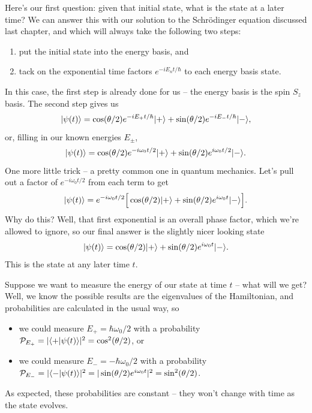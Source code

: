 Here's our first question:  given that initial state, what is the state at a later time?  We can answer this with our solution to the Schr\"odinger equation discussed last chapter, and which will always take the following two steps:
\begin{enumerate}
\item put the initial state into the energy basis, and
\item tack on the exponential time factors $e^{-iE_nt/\hbar}$ to each energy basis state.
\end{enumerate}
In this case, the first step is already done for us -- the energy basis is the spin $S_z$ basis.  The second step gives us
\[
| \psi(t) \rangle = \cos(\theta/2) e^{-iE_+ t / \hbar} | + \rangle + \sin (\theta/2) e^{-iE_- t / \hbar} | - \rangle,
\]
or, filling in our known energies $E_\pm$,
\[
| \psi(t) \rangle = \cos(\theta/2) e^{-i\omega_0 t / 2} | + \rangle + \sin (\theta/2) e^{i\omega_0 t / 2} | - \rangle.
\]
One more little trick -- a pretty common one in quantum mechanics.  Let's pull out a factor of $e^{-i\omega_0 t/2}$ from each term to get
\[
| \psi(t) \rangle = e^{-i\omega_0 t/2} \Big[ \cos(\theta/2) | + \rangle + \sin (\theta/2) e^{i\omega_0 t} | - \rangle \Big].
\]
Why do this?  Well, that first exponential is an overall phase factor, which we're allowed to ignore, so our final answer is the slightly nicer looking state
\begin{equation}
| \psi(t) \rangle =  \cos(\theta/2) | + \rangle + \sin (\theta/2) e^{i\omega_0 t} | - \rangle.
\end{equation}
This is the state at any later time $t$.

Suppose we want to measure the energy of our state at time $t$ -- what will we get?  Well, we know the possible results are the eigenvalues of the Hamiltonian, and probabilities are calculated in the usual way, so
\begin{itemize}
\item we could measure $E_+ = \hbar \omega_0 /2$ with a probability $\mathcal{P}_{E_+} = | \langle + | \psi(t) \rangle |^2 = \cos^2 (\theta/2)$, or
\item we could measure $E_- = -\hbar \omega_0 /2$ with a probability $\mathcal{P}_{E_-} = | \langle - | \psi(t) \rangle |^2 = |\sin (\theta/2) e^{i \omega_0 t}|^2 = \sin^2 (\theta/2)$.
\end{itemize}
As expected, these probabilities are constant -- they won't change with time as the state evolves.

